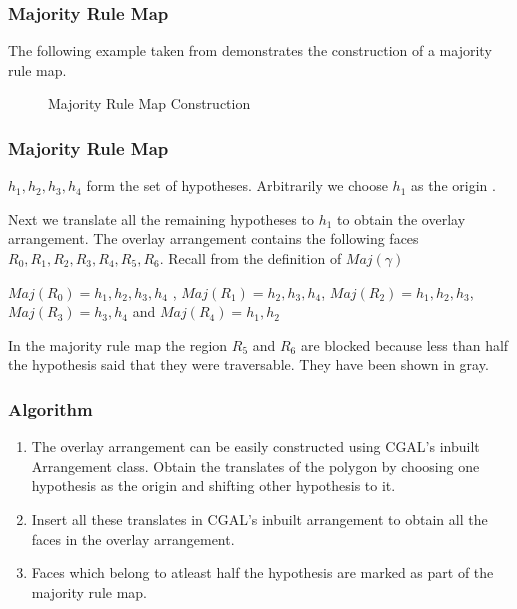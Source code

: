 \documentclass{beamer}
\begin{document}
\frame
{
\frametitle{Majority Rule Map}

The following example taken from \cite{key1} demonstrates the construction of a majority rule map.

\begin{figure}[h]
\begin{center}
\caption{\label{fig:Construction}Majority Rule Map Construction}
\end{center}
\end{figure}
}

\frame
{
\frametitle{Majority Rule Map}

${h_{1},h_{2},h_{3},h_{4}}$ form the set of hypotheses. 
Arbitrarily we choose $h_{1}$ as the origin \vspace{0.1in}.

Next we translate all the remaining hypotheses to $h_{1}$ to obtain the overlay arrangement. The overlay arrangement contains the following faces
$R_{0},R_{1},R_{2},R_{3},R_{4},R_{5},R_{6}$. Recall from the definition of $Maj(\gamma)$

\vspace{0.1in}
$  Maj(R_{0})  =  {h_{1}, h_{2}, h_{3}, h_{4}} $ , $  Maj(R_{1})  =  { h_{2}, h_{3}, h_{4}} $, $ Maj(R_{2})  =  {h_{1}, h_{2}, h_{3}} $,
$  Maj(R_{3})  =  {h_{3}, h_{4}} $ and $  Maj(R_{4})  =  {h_{1}, h_{2}} $ \\
\vspace{0.1in}

In the majority rule map the region $R_{5}$ and $R_{6}$ are blocked because less than half the hypothesis said that they were
 traversable. They have been shown in gray.
}

\frame
{
\frametitle{Algorithm}
\begin{enumerate}
\item
The overlay arrangement can be easily constructed using CGAL's inbuilt Arrangement class. Obtain the translates of the polygon by 
choosing one hypothesis as the origin and shifting other hypothesis to it.
\item
Insert all these translates in CGAL's inbuilt arrangement to obtain all the faces in the overlay arrangement.
\item
Faces which belong to atleast half the hypothesis are marked as part of the majority rule map.
\end{enumerate}

}
\end{document}
